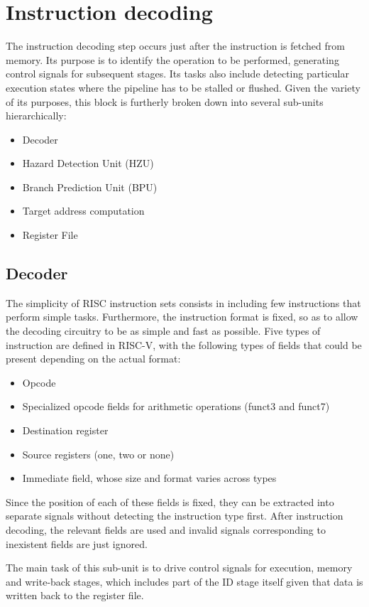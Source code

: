 \section{Instruction decoding}
The instruction decoding step occurs just after the instruction is fetched from memory. Its purpose is to identify the operation to be performed, generating control signals for subsequent stages. Its tasks also include detecting particular execution states where the pipeline has to be stalled or flushed.
Given the variety of its purposes, this block is furtherly broken down into several sub-units hierarchically:
\begin{itemize}
	\item Decoder
	\item Hazard Detection Unit (HZU)
	\item Branch Prediction Unit (BPU)
	\item Target address computation
	\item Register File
\end{itemize}

\subsection{Decoder}
The simplicity of RISC instruction sets consists in including few instructions that perform simple tasks. Furthermore, the instruction format is fixed, so as to allow the decoding circuitry to be as simple and fast as possible. Five types of instruction are defined in RISC-V, with the following types of fields that could be present depending on the actual format:
\begin{itemize}
	\item Opcode
	\item Specialized opcode fields for arithmetic operations (funct3 and funct7)
	\item Destination register
	\item Source registers (one, two or none)
	\item Immediate field, whose size and format varies across types
\end{itemize}
Since the position of each of these fields is fixed, they can be extracted into separate signals without detecting the instruction type first. After instruction decoding, the relevant fields are used and invalid signals corresponding to inexistent fields are just ignored.

The main task of this sub-unit is to drive control signals for execution, memory and write-back stages, which includes part of the ID stage itself given that data is written back to the register file.

